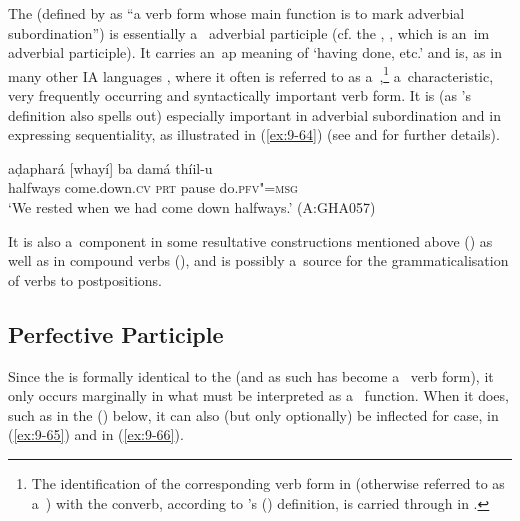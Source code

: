 The  (defined by \citet{haspelmath1995} as ``a  verb form whose main function is to mark adverbial subordination'') is essentially a~ adverbial participle (cf. the , , which is an~im adverbial participle). It carries an~ap meaning of `having done, etc.' and is, as in many other IA languages \citep[323, 397--401]{masica1991}, where it often is referred to as a~,\footnote{The identification of the corresponding verb form in   (otherwise referred to as a~) with the converb, according to \citeauthor{haspelmath1995}'s (\citeyear{haspelmath1995}) definition, is carried through in \citet{schmidt2003}.} a~characteristic, very frequently occurring and syntactically important  verb form. It is (as \citeauthor{haspelmath1995}'s definition also spells out) especially important in adverbial subordination and in expressing  sequentiality, as illustrated in (\ref{ex:9-64}) (see  and  for further details).

\begin{exe}
\ex
\label{ex:9-64}
\gll aḍaphará [whayí] ba damá thíil-u \\
halfways come.down.\textsc{cv} \textsc{prt} pause do.\textsc{pfv"=msg} \\
\glt `We rested when we had come down halfways.' (A:GHA057)
\end{exe}

It is also a~component in some resultative constructions mentioned above () as well as in compound verbs (), and is possibly a~source for the grammaticalisation of verbs to postpositions.


\subsection{Perfective Participle}
\label{subsec:9-3-2}


Since the  is formally identical to the  (and as such has become a~ verb form), it only occurs marginally in what must be interpreted as a~ function. When it does, such as in the ()  below, it can also (but only optionally) be inflected for case,  in (\ref{ex:9-65}) and  in (\ref{ex:9-66}).

